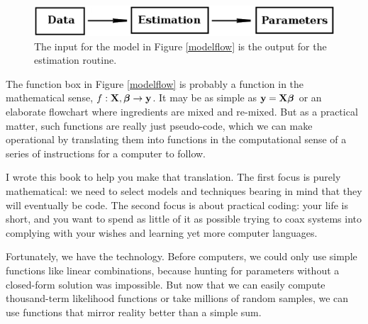 \begin{figure}[htb]
\begin{center}
\includegraphics[width=\textwidth*\real{0.85}]{models2.eps}
\end{center}

\caption{The input for the model in Figure \ref{modelflow} is the output for the estimation routine.}
\label{modelflowback}
\end{figure}


 The function box in Figure \ref{modelflow} is probably a
function in the mathematical sense, $f:{\bf X}, {\mbox{\boldmath$\beta$}} \to {\bf y}$. It may
be as simple as ${\bf y} = {\bf X}{\mbox{\boldmath$\beta$}}$ or an elaborate flowchart where
ingredients are mixed and re-mixed.  But as a practical matter, such
functions are really just pseudo-code, which we can make operational by
translating them into functions in the computational sense of a series
of instructions for a computer to follow.

I wrote this book to help you make that translation. The first focus
is purely mathematical: we need to select models and techniques bearing
in mind that they will eventually be code. The second focus is about
practical coding: your life is short, and you want to spend as little
of it as possible trying to coax systems into complying with your wishes
and learning yet more computer languages.

Fortunately, we have the technology. Before computers, we could only
use simple functions like linear combinations, because hunting for
parameters without a closed-form solution was impossible. 
But now that we can easily compute thousand-term likelihood functions
or take millions of random samples, we can use functions that mirror
reality better than a simple sum.


